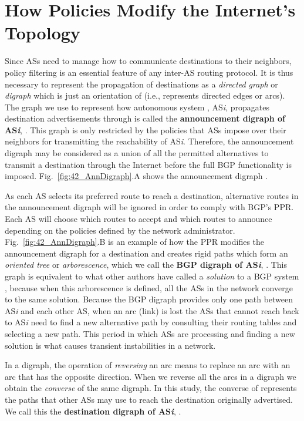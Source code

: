 \documentclass[10pt,final,journal]{IEEEtran}
\begin{document}
\section{How Policies Modify the Internet's Topology}\label{how_policy_mod_topology}

Since ASs need to manage how to communicate destinations to their neighbors, policy filtering is an essential feature of any inter-AS routing protocol. It is thus necessary to represent the propagation of destinations as a \emph{directed graph} or \emph{digraph}  which is just an orientation of  (i.e.,  represents directed edges or arcs). The graph we use to represent how autonomous system , AS\textit{i}, propagates destination advertisements through  is called the \textbf{announcement digraph of AS\textit{i}}, . This graph is only restricted by the policies that ASs impose over their neighbors for transmitting the reachability of AS\textit{i}. Therefore, the announcement digraph may be considered as a union of all the permitted alternatives to transmit a destination through the Internet before the full BGP functionality is imposed. Fig.~\ref{fig:42_AnnDigraph}.A shows the announcement digraph .

As each AS selects its preferred route to reach a destination, alternative routes in the announcement digraph will be ignored in order to comply with BGP's PPR. Each AS will choose which routes to accept and which routes to announce depending on the policies defined by the network administrator. Fig.~\ref{fig:42_AnnDigraph}.B is an example of how the PPR modifies the announcement digraph for a destination and creates rigid paths which form an \emph{oriented tree} or \emph{arborescence}, which we call the \textbf{BGP digraph of AS\textit{i}}, . This graph is equivalent to what other authors have called a \emph{solution} to a BGP system \cite{Griffin1999}, because when this arborescence is defined, all the ASs in the network converge to the same solution. Because the BGP digraph provides only one path between AS\textit{i} and each other AS, when an arc (link) is lost the ASs that cannot reach back to AS\textit{i} need to find a new alternative path by consulting their routing tables and selecting a new path. This period in which ASs are processing and finding a new solution is what causes transient instabilities in a network.

In a digraph, the operation of \emph{reversing} an arc means to replace an arc  with an arc  that has the opposite direction. When we reverse all the arcs in a digraph we obtain the \emph{converse} of the same digraph. In this study, the converse of  represents the paths that other ASs may use to reach the destination originally advertised. We call this the \textbf{destination digraph of AS\textit{i}}, .
\end{document}
